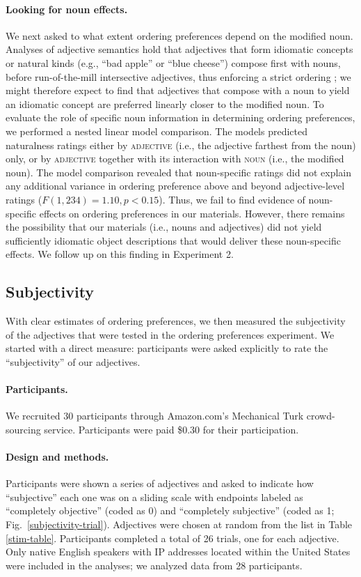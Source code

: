 \documentclass[12pt]{article}
\begin{document}
\paragraph{Looking for noun effects.} We next asked to what extent ordering preferences depend on the modified noun. Analyses of adjective semantics hold that adjectives that form idiomatic concepts or natural kinds (e.g., ``bad apple'' or ``blue cheese'') compose first with nouns, before run-of-the-mill intersective adjectives, thus enforcing a strict ordering \citep{McNally2004,svenonius2008}; we might therefore expect to find that adjectives that compose with a noun to yield an idiomatic concept are preferred linearly closer to the modified noun. 
To evaluate the role of specific noun information in determining ordering preferences, we performed a nested linear model comparison. The models predicted naturalness ratings either by \textsc{adjective} (i.e., the adjective farthest from the noun) only, or by \textsc{adjective} together with its interaction with \textsc{noun} (i.e., the modified noun).
The model comparison revealed that noun-specific ratings did not explain any additional variance in ordering preference above and beyond adjective-level ratings ($F(1,234) = 1.10, p < 0.15$).  Thus, we fail to find evidence of noun-specific effects on ordering preferences in our materials. However, there remains the possibility that our materials (i.e., nouns and adjectives) did not yield sufficiently idiomatic object descriptions that would deliver these noun-specific effects. We follow up on this finding in Experiment 2.


\subsection{Subjectivity}

With clear estimates of ordering preferences, we then measured the subjectivity of the adjectives that were tested in the ordering preferences experiment. We started with a direct measure: participants were asked explicitly to rate the ``subjectivity'' of our adjectives.

\paragraph{Participants.} We recruited 30 participants through Amazon.com's Mechanical Turk crowd-sourcing service. Participants were paid \$0.30 for their participation. 

\paragraph{Design and methods.} Participants were shown a series of adjectives and asked to indicate how ``subjective'' each one was on a sliding scale with endpoints labeled as ``completely objective'' (coded as 0) and ``completely subjective'' (coded as 1; Fig.~\ref{subjectivity-trial}). Adjectives were chosen at random from the list in Table \ref{stim-table}. Participants completed a total of 26 trials, one for each adjective. Only native English speakers with IP addresses located within the United States were included in the analyses; we analyzed data from 28 participants.
\end{document}
